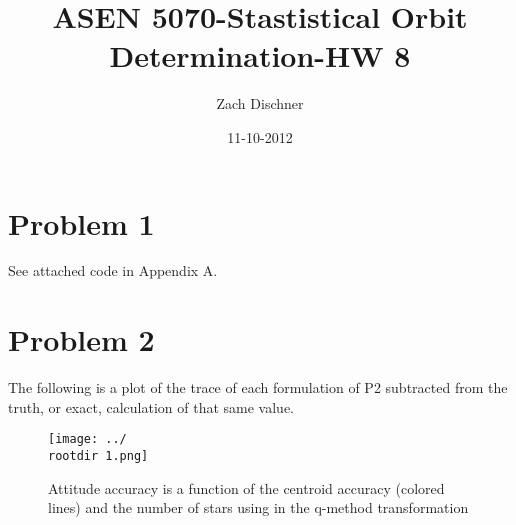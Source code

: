 \documentclass[]{article}
\newcommand{\rootdir}{./Figures/}
\begin{document}
\title{ASEN 5070-Stastistical Orbit Determination-HW 8}
\author{Zach Dischner}
\date{11-10-2012}
\maketitle


\section{Problem 1} 

See attached code in Appendix A. 

\section{Problem 2}
The following is a plot of the trace of each formulation of P2 subtracted from the truth, or exact, calculation of that same value. 

\begin{figure}[Trace]
    \centering
    \texttt{[image: ../\\rootdir 1.png]}
    \caption{Attitude accuracy is a function of the centroid accuracy (colored lines) and the number of stars using in the q-method transformation}
    \label{fig:accuracy}
\end{figure}
\end{document}
